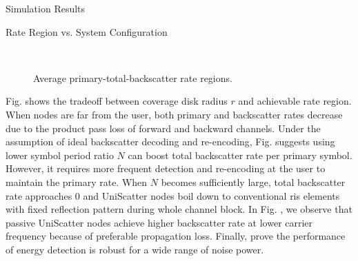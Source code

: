 \documentclass[journal]{IEEEtran}
\begin{document}
\begin{section}{Simulation Results}
\begin{subsection}{Rate Region vs. System Configuration}
		\begin{figure}[!t]
			\centering
			\\
			\caption{Average primary-total-backscatter rate regions.}
			\label{fi:region_config_2}
		\end{figure}

		Fig.  shows the tradeoff between coverage disk radius $r$ and achievable rate region.
		When nodes are far from the user, both primary and backscatter rates decrease due to the product pass loss of forward and backward channels.
		Under the assumption of ideal backscatter decoding and re-encoding, Fig.  suggests using lower symbol period ratio $N$ can boost total backscatter rate per primary symbol.
		However, it requires more frequent detection and re-encoding at the user to maintain the primary rate.
		When $N$ becomes sufficiently large, total backscatter rate approaches \num{0} and UniScatter nodes boil down to conventional \gls{ris} elements with fixed reflection pattern during whole channel block.
		In Fig. , we observe that passive UniScatter nodes achieve higher backscatter rate at lower carrier frequency because of preferable propagation loss.
		Finally,  prove the performance of energy detection is robust for a wide range of noise power.
	\end{subsection}
	\label{se:simulation_results}
\end{section}
\end{document}
